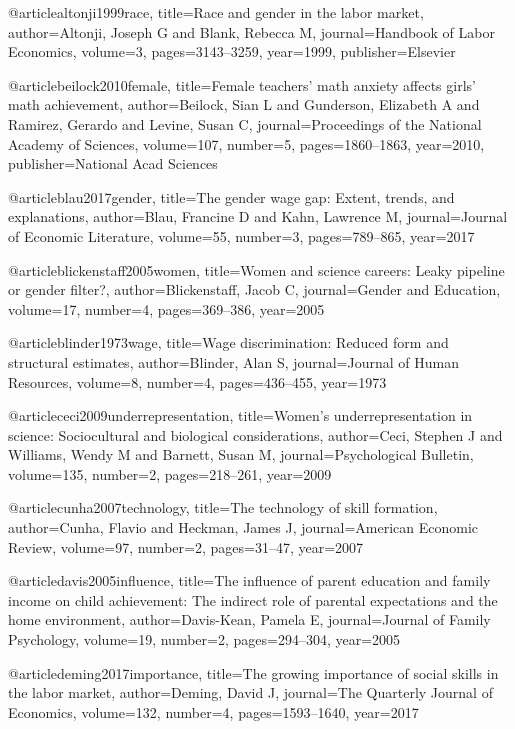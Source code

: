 @article{altonji1999race,
  title={Race and gender in the labor market},
  author={Altonji, Joseph G and Blank, Rebecca M},
  journal={Handbook of Labor Economics},
  volume={3},
  pages={3143--3259},
  year={1999},
  publisher={Elsevier}
}

@article{beilock2010female,
  title={Female teachers’ math anxiety affects girls’ math achievement},
  author={Beilock, Sian L and Gunderson, Elizabeth A and Ramirez, Gerardo and Levine, Susan C},
  journal={Proceedings of the National Academy of Sciences},
  volume={107},
  number={5},
  pages={1860--1863},
  year={2010},
  publisher={National Acad Sciences}
}

@article{blau2017gender,
  title={The gender wage gap: Extent, trends, and explanations},
  author={Blau, Francine D and Kahn, Lawrence M},
  journal={Journal of Economic Literature},
  volume={55},
  number={3},
  pages={789--865},
  year={2017}
}

@article{blickenstaff2005women,
  title={Women and science careers: Leaky pipeline or gender filter?},
  author={Blickenstaff, Jacob C},
  journal={Gender and Education},
  volume={17},
  number={4},
  pages={369--386},
  year={2005}
}

@article{blinder1973wage,
  title={Wage discrimination: Reduced form and structural estimates},
  author={Blinder, Alan S},
  journal={Journal of Human Resources},
  volume={8},
  number={4},
  pages={436--455},
  year={1973}
}

@article{ceci2009underrepresentation,
  title={Women’s underrepresentation in science: Sociocultural and biological considerations},
  author={Ceci, Stephen J and Williams, Wendy M and Barnett, Susan M},
  journal={Psychological Bulletin},
  volume={135},
  number={2},
  pages={218--261},
  year={2009}
}

@article{cunha2007technology,
  title={The technology of skill formation},
  author={Cunha, Flavio and Heckman, James J},
  journal={American Economic Review},
  volume={97},
  number={2},
  pages={31--47},
  year={2007}
}

@article{davis2005influence,
  title={The influence of parent education and family income on child achievement: The indirect role of parental expectations and the home environment},
  author={Davis-Kean, Pamela E},
  journal={Journal of Family Psychology},
  volume={19},
  number={2},
  pages={294--304},
  year={2005}
}

@article{deming2017importance,
  title={The growing importance of social skills in the labor market},
  author={Deming, David J},
  journal={The Quarterly Journal of Economics},
  volume={132},
  number={4},
  pages={1593--1640},
  year={2017}
}


